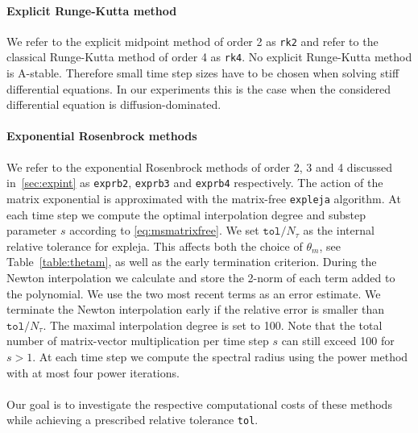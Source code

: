 \documentclass{scrartcl}
\begin{document}
	\paragraph{Explicit Runge-Kutta method}
	We refer to the explicit midpoint method of order 2 as \texttt{rk2} and refer to the classical Runge-Kutta method of order 4 as \texttt{rk4}. No explicit Runge-Kutta method is A-stable. Therefore small time step sizes have to be chosen when solving stiff differential equations. In our experiments this is the case when the considered differential equation is diffusion-dominated.
	
	\paragraph{Exponential Rosenbrock methods}
	We refer to the exponential Rosenbrock methods of order 2, 3 and 4 discussed in~\ref{sec:expint} as \texttt{exprb2}, \texttt{exprb3} and \texttt{exprb4} respectively.
	The action of the matrix exponential is approximated with the matrix-free \texttt{expleja} algorithm. At each time step we compute the optimal interpolation degree and substep parameter $s$ according to \eqref{eq:msmatrixfree}. We set $\texttt{tol}/N_\tau$ as the internal relative tolerance for expleja. This affects both the choice of $\theta_m$, see Table~\ref{table:thetam}, as well as the early termination criterion. During the Newton interpolation we calculate and store the 2-norm of each term added to the polynomial. We use the two most recent terms as an error estimate. We terminate the Newton interpolation early if the relative error is smaller than $\texttt{tol}/N_\tau$.
	The maximal interpolation degree is set to 100. Note that the total number of matrix-vector multiplication per time step $s$ can still exceed 100 for $s>1$. At each time step we compute the spectral radius using the power method with at most four power iterations.\\
	\\
	Our goal is to investigate the respective computational costs of these methods while achieving a prescribed relative tolerance \texttt{tol}.
	
\end{document}
